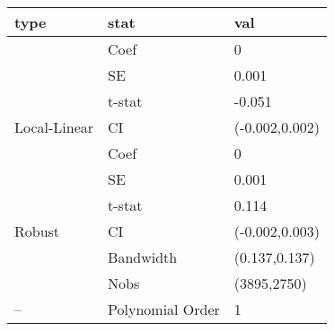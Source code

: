 
\begin{tabular}{lll}
\toprule
type & stat & val\\
\midrule
 & Coef & 0\\

 & SE & 0.001\\

 & t-stat & -0.051\\

\multirow{-4}{*}{\raggedright\arraybackslash Local-Linear} & CI & (-0.002,0.002)\\
\cmidrule{1-3}
 & Coef & 0\\

 & SE & 0.001\\

 & t-stat & 0.114\\

\multirow{-4}{*}{\raggedright\arraybackslash Robust} & CI & (-0.002,0.003)\\
\cmidrule{1-3}
 & Bandwidth & (0.137,0.137)\\

 & Nobs & (3895,2750)\\

\multirow{-3}{*}{\raggedright\arraybackslash --} & Polynomial Order & 1\\
\bottomrule
\end{tabular}